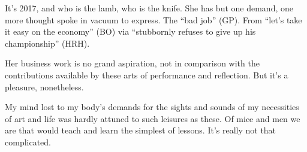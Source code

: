 

﻿It's 2017, and who is the lamb, who is the knife.  She has but one
demand, one more thought spoke in vacuum to express.  The ``bad job''
(GP).  From ``let's take it easy on the economy'' (BO) via ``stubbornly
refuses to give up his championship'' (HRH).

Her business work is no grand aspiration, not in comparison with the
contributions available by these arts of performance and reflection.
But it's a pleasure, nonetheless.

My mind lost to my body's demands for the sights and sounds of my
necessities of art and life was hardly attuned to such leisures as
these.  Of mice and men we are that would teach and learn the simplest
of lessons.  It's really not that complicated.

\bye

